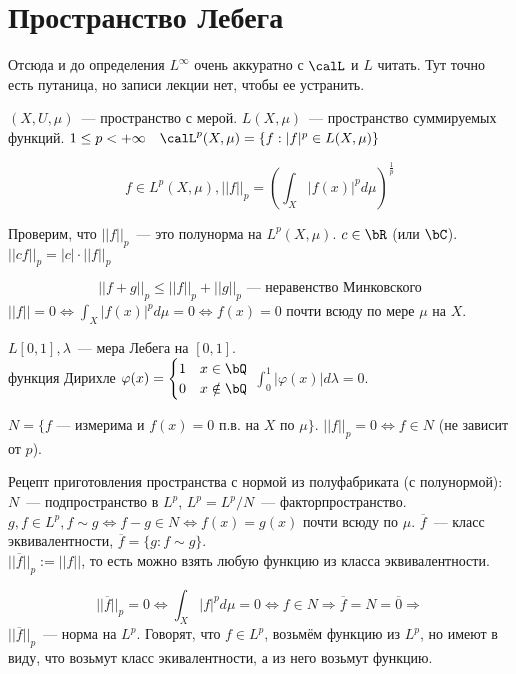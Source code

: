 \documentclass[document]{subfiles}
\begin{document}
\section{Пространство Лебега}
Отсюда и до определения $L^\infty$ очень аккуратно с $\calL$ и $L$ читать. Тут точно есть путаница, но записи лекции нет, чтобы ее устранить.
\begin{definition}
    $(X, U, \mu)$~--- пространство с мерой. $L(X, \mu)$~--- пространство суммируемых функций. $1 \leq p < +\infty \quad \calL^p(X, \mu) = \{ f: |f|^p \in L(X,\mu) \}$ 
\end{definition}

\[f \in L^p(X, \mu), ||f||_p = \left( \int_X |f(x)|^p d \mu \right)^{\frac{1}{p}} \]

Проверим, что $||f||_p$~--- это полунорма на $L^p(X,\mu)$. $c \in \bR$ (или $\bC$). $||cf||_p = |c| \cdot ||f||_p$

\[ ||f+g||_p \leq ||f||_p + ||g||_p \text{~--- неравенство Минковского} \]
$||f|| = 0 \Leftrightarrow \int_X |f(x)|^p d\mu = 0 \Leftrightarrow f(x) = 0$ почти всюду по мере $\mu$ на $X$.

\begin{example}
    $L[0,1], \lambda$~--- мера Лебега на $[0,1]$. \\
     функция Дирихле $\varphi(x) = \begin{cases}
        1 &x \in \bQ \\
        0 & x \notin \bQ
    \end{cases}$
    $\int^1_0 |\varphi(x)|d\lambda = 0$.
\end{example}

$N = \{ f \text{~--- измерима и } f(x) = 0 \text{ п.в. на } X \text { по } \mu \}.$
$||f||_p = 0 \Leftrightarrow f \in N$ (не зависит от $p$).

Рецепт приготовления  пространства с нормой из полуфабриката (с полунормой): 
$N$~--- подпространство в $L^p$, $L^p = L^p / N$~--- факторпространство. \\

$g,f \in L^p, f \sim g \Leftrightarrow f - g \in N \Leftrightarrow f(x) = g(x)$ почти всюду по $\mu$. $\overline{f}$~--- класс эквивалентности, $\overline{f} = \{g: f \sim g \}.$ \\

$||\overline{f}||_p := ||f||$, то есть можно взять любую функцию из класса эквивалентности.

\[ ||\overline{f}||_p = 0 \Leftrightarrow \int_X |f|^p d\mu = 0 \Leftrightarrow f \in N \Rightarrow \overline{f} = N = \overline{0} \Rightarrow \]
$||\overline{f}||_p $~--- норма на $L^p$.
Говорят, что $f \in L^p$, возьмём функцию из $L^p$, но имеют в виду, что возьмут класс экивалентности, а из него возьмут функцию.
\end{document}
